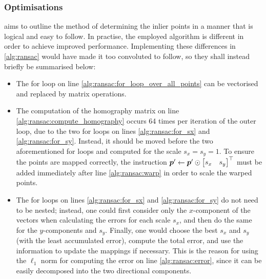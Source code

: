 \documentclass[../report.tex]{subfiles}
\begin{document}
\subsubsection{Optimisations}
 aims to outline the method of determining the inlier points in a manner that is logical and easy to follow.
In practise, the employed algorithm is different in order to achieve improved performance.
Implementing these differences in \cref{alg:ransac} would have made it too convoluted to follow, so they shall instead briefly be summarised below:
\begin{itemize}
    \item The for loop on line \ref{alg:ransac:for_loop_over_all_points} can be vectorised and replaced by matrix operations.
    \item The computation of the homography matrix on line \ref{alg:ransac:compute_homography} occurs 64 times per iteration of the outer loop, due to the two for loops on lines \ref{alg:ransac:for_sx} and \ref{alg:ransac:for_sy}.
        Instead, it should be moved before the two aforementioned for loops and computed for the scale $s_x=s_y=1$.
        To ensure the points are mapped correctly, the instruction ${\bm{p}}' \gets {\bm{p}}' \odot \begin{bmatrix}
            s_x & s_y
        \end{bmatrix}^\top$ must be added immediately after line \ref{alg:ransac:warp} in order to scale the warped points.
    \item The for loops on lines \ref{alg:ransac:for_sx} and \ref{alg:ransac:for_sy} do not need to be nested; instead, one could first consider only the $x$-component of the vectors when calculating the errors for each scale $s_x$, and then do the same for the $y$-components and $s_y$.
        Finally, one would choose the best $s_x$ and $s_y$ (with the least accumulated error), compute the total error, and use the information to update the mappings if necessary.
        This is the reason for using the $\ell_1$ norm for computing the error on line \ref{alg:ransac:error}, since it can be easily decomposed into the two directional components.
\end{itemize}
\end{document}
